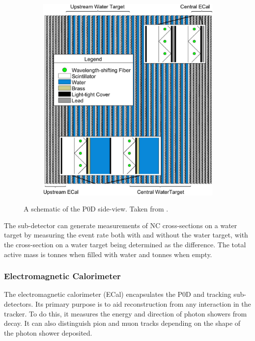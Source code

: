\begin{figure}[h]
  \begin{subfigure}[t]{0.55\textwidth}
    \includegraphics[width=\textwidth, trim={0mm 0mm 0mm 0mm}, clip,page=1]{Figures/Detectors/T2KP0DDesign.pdf}
  \end{subfigure}
  \caption{A schematic of the P0D side-view. Taken from \cite{Assylbekov2012}.}
  \label{fig:T2KSKExp_T2K_P0DDesign}
\end{figure}

The sub-detector can generate measurements of NC cross-sections on a water target by measuring the event rate both with and without the water target, with the cross-section on a water target being determined as the difference. The total active mass is  tonnes when filled with water and  tonnes when empty.

\subsubsection{Electromagnetic Calorimeter}
\label{subsubsec:T2KSKExp_T2K_ECAL}

The electromagnetic calorimeter \cite{Allan_2013} (ECal) encapsulates the P0D and tracking sub-detectors. Its primary purpose is to aid  reconstruction from any interaction in the tracker. To do this, it measures the energy and direction of photon showers from \quickmath{\pi^0 \rightarrow 2\gamma} decay. It can also distinguish pion and muon tracks depending on the shape of the photon shower deposited.

